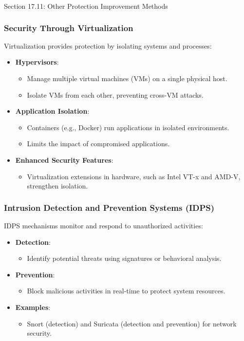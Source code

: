 \begin{notes}{Section 17.11: Other Protection Improvement Methods}
    \subsubsection*{Security Through Virtualization}
    
    Virtualization provides protection by isolating systems and processes:
    \begin{itemize}
        \item \textbf{Hypervisors}:
        \begin{itemize}
            \item Manage multiple virtual machines (VMs) on a single physical host.
            \item Isolate VMs from each other, preventing cross-VM attacks.
        \end{itemize}
        \item \textbf{Application Isolation}:
        \begin{itemize}
            \item Containers (e.g., Docker) run applications in isolated environments.
            \item Limits the impact of compromised applications.
        \end{itemize}
        \item \textbf{Enhanced Security Features}:
        \begin{itemize}
            \item Virtualization extensions in hardware, such as Intel VT-x and AMD-V, strengthen isolation.
        \end{itemize}
    \end{itemize}
    
    \subsubsection*{Intrusion Detection and Prevention Systems (IDPS)}
    
    IDPS mechanisms monitor and respond to unauthorized activities:
    \begin{itemize}
        \item \textbf{Detection}:
        \begin{itemize}
            \item Identify potential threats using signatures or behavioral analysis.
        \end{itemize}
        \item \textbf{Prevention}:
        \begin{itemize}
            \item Block malicious activities in real-time to protect system resources.
        \end{itemize}
        \item \textbf{Examples}:
        \begin{itemize}
            \item Snort (detection) and Suricata (detection and prevention) for network security.
        \end{itemize}
    \end{itemize}
    

\end{notes}
